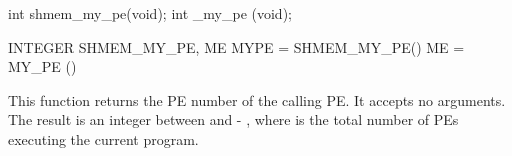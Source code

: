 
\synC
int shmem_my_pe(void);
int _my_pe (void);

\synF 
INTEGER SHMEM_MY_PE, ME
MYPE = SHMEM_MY_PE()
ME = MY_PE ()


{
	This function returns the \ac{PE} number of the calling
  \ac{PE}.   It accepts no arguments.	The result is an integer between  and
   - , where  is the total number of \ac{PE}s executing  the  current
  program.
}
{



}
\eAPI

